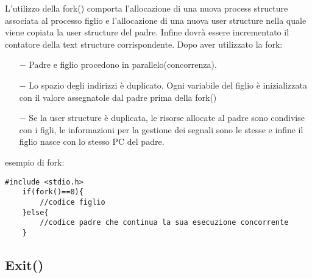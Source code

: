 \documentclass{article}
\begin{document}
\noindent L'utilizzo della fork() comporta l'allocazione di una nuova process 
structure associata al processo figlio e l'allocazione di
una nuova user structure nella quale viene copiata la user structure del padre.
Infine dovrà essere incrementato il contatore della text structure corrispondente.
Dopo aver utilizzato la fork:\begin{itemize}
    \item[$-$] Padre e figlio procedono in parallelo(concorrenza).
    \item[$-$] Lo spazio degli indirizzi è duplicato.
     Ogni variabile del figlio è inizializzata con il valore assegnatole dal padre
     prima della fork()
    \item[$-$] Se la user structure è duplicata, le risorse allocate al
    padre sono condivise con i figli, le informazioni per la gestione dei
    segnali sono le stesse e infine il figlio nasce con lo stesso PC del padre.
\end{itemize}

esempio di fork:
\begin{lstlisting}[style=CStyle]
    #include <stdio.h>
    if(fork()==0){
        //codice figlio
    }else{
        //codice padre che continua la sua esecuzione concorrente
    }

\end{lstlisting}

\subsection{Exit()}

\noindent{}
\medskip
\end{document}
